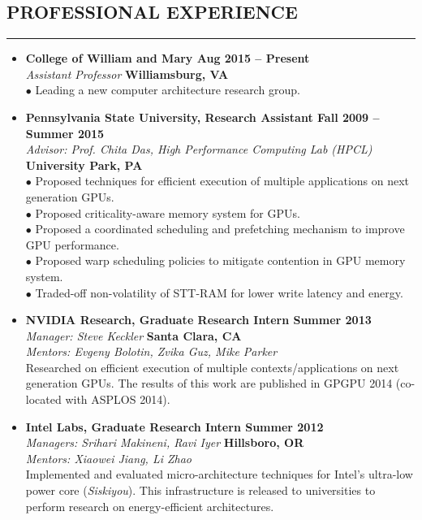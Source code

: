 \documentclass[10pt,a4]{article}
\begin{document}
\subsection*{PROFESSIONAL EXPERIENCE}
\hrule
\vspace{0.2cm}
\begin{itemize}

\item{\bf College of William and Mary \hfill {\bf Aug 2015 -- Present}} \\
{\it Assistant Professor} \hfill {\bf Williamsburg, VA}\\
$\bullet$ Leading a new computer architecture research group. 

\item{\bf Pennsylvania State University, Research Assistant \hfill {\bf Fall 2009 -- Summer 2015}}\\
{\it Advisor: Prof. Chita Das, High Performance Computing Lab (HPCL)} \hfill {\bf University Park, PA}\\
$\bullet$ Proposed techniques for efficient execution of multiple applications on next generation GPUs.  \\ 
$\bullet$ Proposed criticality-aware memory system for GPUs. \\ 
$\bullet$ Proposed a coordinated scheduling and prefetching mechanism to improve GPU performance. \\
$\bullet$ Proposed warp scheduling policies to mitigate contention in GPU memory system. \\
$\bullet$ Traded-off non-volatility of STT-RAM for lower write latency and energy.

\item{\bf NVIDIA Research, Graduate Research Intern \hfill {\bf Summer 2013}} \\
{\it Manager: Steve Keckler}  \hfill {\bf Santa Clara, CA} \\ 
{\it Mentors: Evgeny Bolotin, Zvika Guz, Mike Parker}  \\
Researched on efficient execution of multiple contexts/applications on next generation GPUs.
The results of this work are published in GPGPU 2014 (co-located with ASPLOS 2014).

\item{\bf Intel Labs, Graduate Research Intern \hfill {\bf Summer 2012}} \\
{\it Managers: Srihari Makineni, Ravi Iyer}  \hfill {\bf Hillsboro, OR} \\ 
{\it Mentors: Xiaowei Jiang, Li Zhao}    \\
Implemented and evaluated micro-architecture techniques for Intel's ultra-low power core ({\it Siskiyou}).
This infrastructure is released to universities to perform research on energy-efficient architectures.


\end{itemize}
\end{document}

